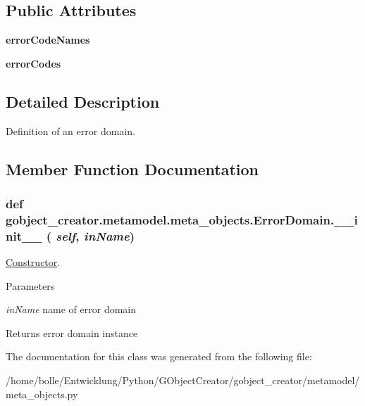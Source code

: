 \subsection*{Public Attributes}
\begin{DoxyCompactItemize}
\item 
\hypertarget{classgobject__creator_1_1metamodel_1_1meta__objects_1_1ErrorDomain_a6a73d0d282a1c4c36bfa80c781592c8c}{
{\bfseries errorCodeNames}}
\label{classgobject__creator_1_1metamodel_1_1meta__objects_1_1ErrorDomain_a6a73d0d282a1c4c36bfa80c781592c8c}

\item 
\hypertarget{classgobject__creator_1_1metamodel_1_1meta__objects_1_1ErrorDomain_a1018823da5fbbbe40a93a2ea99c7d41a}{
{\bfseries errorCodes}}
\label{classgobject__creator_1_1metamodel_1_1meta__objects_1_1ErrorDomain_a1018823da5fbbbe40a93a2ea99c7d41a}

\end{DoxyCompactItemize}


\subsection{Detailed Description}
Definition of an error domain. 

\subsection{Member Function Documentation}
\hypertarget{classgobject__creator_1_1metamodel_1_1meta__objects_1_1ErrorDomain_a181b703484bd6321e6e2bffbf78eb024}{
\subsubsection[{\_\-\_\-init\_\-\_\-}]{\setlength{\rightskip}{0pt plus 5cm}def gobject\_\-creator.metamodel.meta\_\-objects.ErrorDomain.\_\-\_\-init\_\-\_\- ( {\em self}, \/   {\em inName})}}
\label{classgobject__creator_1_1metamodel_1_1meta__objects_1_1ErrorDomain_a181b703484bd6321e6e2bffbf78eb024}


\hyperlink{classgobject__creator_1_1metamodel_1_1meta__objects_1_1Constructor}{Constructor}. 


\begin{DoxyParams}{Parameters}
\item[{\em inName}]name of error domain \end{DoxyParams}
\begin{DoxyReturn}{Returns}
error domain instance 
\end{DoxyReturn}


The documentation for this class was generated from the following file:\begin{DoxyCompactItemize}
\item 
/home/bolle/Entwicklung/Python/GObjectCreator/gobject\_\-creator/metamodel/meta\_\-objects.py\end{DoxyCompactItemize}

